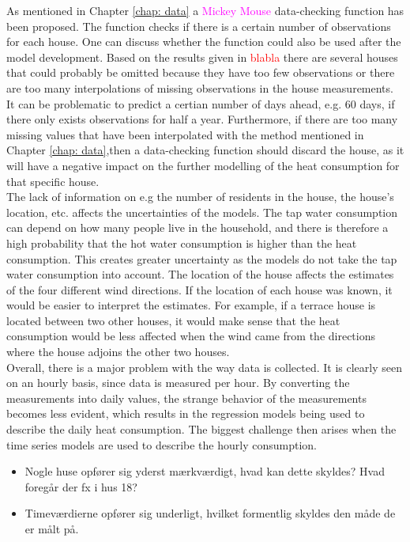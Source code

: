 \noindent As mentioned in Chapter \ref{chap: data} a \textcolor{magenta}{Mickey Mouse} data-checking function has been proposed. The function checks if there is a certain number of observations for each house. One can discuss whether the function could also be used after the model development. Based on the results given in \textcolor{red}{blabla} there are several houses that could probably be omitted because they have too few observations or there are too many interpolations of missing observations in the house measurements. It can be problematic to predict a certian number of days ahead, e.g. 60 days, if there only exists observations for half a year. Furthermore, if there are too many missing values ​​that have been interpolated with the method mentioned in Chapter \ref{chap: data},then a data-checking function should discard the house, as it will have a negative impact on the further modelling of the heat consumption for that specific house. \\

\noindent The lack of information on e.g the number of residents in the house, the house's location, etc. affects the uncertainties of the models. The tap water consumption can depend on how many people live in the household, and there is therefore a high probability that the hot water consumption is higher than the heat consumption. This creates greater uncertainty as the models do not take the tap water consumption into account. The location of the house affects the estimates of the four different wind directions. If the location of each house was known, it would be easier to interpret the estimates. For example, if a terrace house is located between two other houses, it would make sense that the heat consumption would be less affected when the wind came from the directions where the house adjoins the other two houses. \\

\noindent Overall, there is a major problem with the way data is collected. It is clearly seen on an hourly basis, since data is measured per hour. By converting the measurements into daily values, the strange behavior of the measurements becomes less evident, which results in the regression models being used to describe the daily heat consumption. The biggest challenge then arises when the time series models are used to describe the hourly consumption.


\begin{itemize}
    \item Nogle huse opfører sig yderst mærkværdigt, hvad kan dette skyldes? Hvad foregår der fx i hus 18?
    \item Timeværdierne opfører sig underligt, hvilket formentlig skyldes den måde de er målt på. 
\end{itemize}

